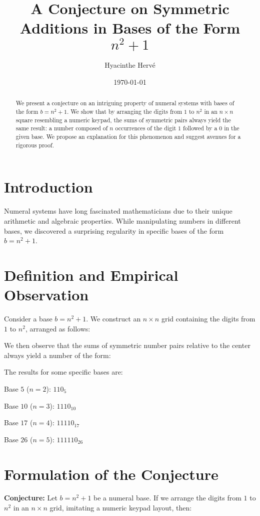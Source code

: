 \documentclass{article}
\title{A Conjecture on Symmetric Additions in Bases of the Form $n^2 + 1$}
\author{Hyacinthe Herv\'e}
\date{\today}
\begin{document}
\maketitle

\begin{abstract}
We present a conjecture on an intriguing property of numeral systems with bases of the form $b = n^2 + 1$. We show that by arranging the digits from $1$ to $n^2$ in an $n \times n$ square resembling a numeric keypad, the sums of symmetric pairs always yield the same result: a number composed of $n$ occurrences of the digit $1$ followed by a $0$ in the given base. We propose an explanation for this phenomenon and suggest avenues for a rigorous proof.
\end{abstract}

\section{Introduction}

Numeral systems have long fascinated mathematicians due to their unique arithmetic and algebraic properties. While manipulating numbers in different bases, we discovered a surprising regularity in specific bases of the form $b = n^2 + 1$.

\section{Definition and Empirical Observation}

Consider a base $b = n^2 + 1$. We construct an $n \times n$ grid containing the digits from $1$ to $n^2$, arranged as follows:

We then observe that the sums of symmetric number pairs relative to the center always yield a number of the form:

The results for some specific bases are:

Base $5$ ($n=2$): $110_5$

Base $10$ ($n=3$): $1110_{10}$

Base $17$ ($n=4$): $11110_{17}$

Base $26$ ($n=5$): $111110_{26}$

\section{Formulation of the Conjecture}

\textbf{Conjecture:} Let $b = n^2 + 1$ be a numeral base. If we arrange the digits from $1$ to $n^2$ in an $n \times n$ grid, imitating a numeric keypad layout, then:
\end{document}
